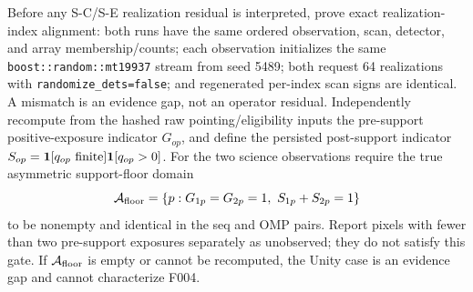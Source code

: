 \documentclass[11pt]{article}
\newcommand{\code}[1]{\nolinkurl{#1}}
\begin{document}
Before any S-C/S-E realization residual is interpreted, prove exact
realization-index alignment: both runs have the same ordered observation,
scan, detector, and array membership/counts; each observation initializes the
same \code{boost::random::mt19937} stream from seed 5489; both request 64
realizations with \code{randomize_dets=false}; and regenerated per-index scan
signs are identical.  A mismatch is an evidence gap, not an operator residual.
Independently recompute from the hashed raw pointing/eligibility inputs the
pre-support positive-exposure indicator \(G_{op}\), and define the persisted
post-support indicator
\(S_{op}={\bf1}[q_{op}\text{ finite}]{\bf1}[q_{op}>0]\).  For the two science
observations require the true asymmetric support-floor domain
\[
 \mathcal A_{\rm floor}
 =\{p:G_{1p}=G_{2p}=1,\ S_{1p}+S_{2p}=1\}
\]
to be nonempty and identical in the seq and OMP pairs.  Report pixels with
fewer than two pre-support exposures separately as unobserved; they do not
satisfy this gate.  If \(\mathcal A_{\rm floor}\) is empty or cannot be
recomputed, the Unity case is an evidence gap and cannot characterize F004.
\end{document}

